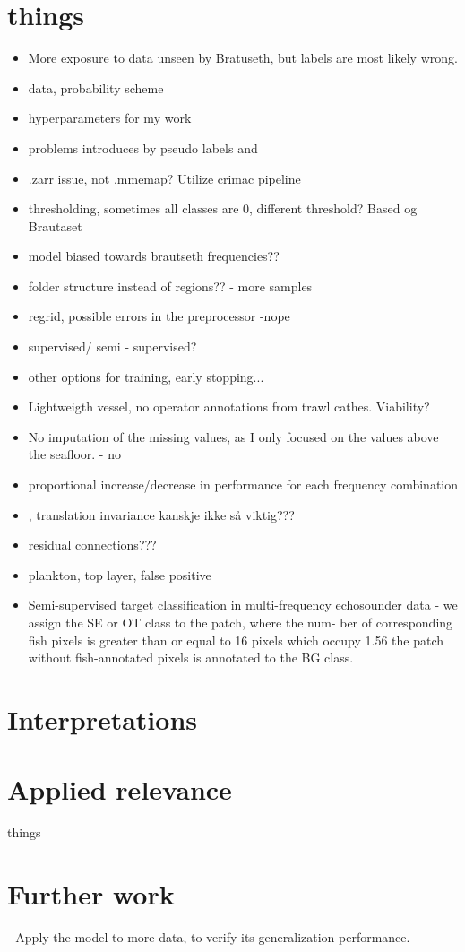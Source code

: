     \section{things}
        \begin{itemize}
            \item More exposure to data unseen by Bratuseth, but labels are most likely wrong. 
            \item data, probability scheme
            \item hyperparameters for my work
            \item problems introduces by pseudo labels and 
            \item .zarr issue, not .mmemap? Utilize crimac pipeline
            \item thresholding, sometimes all classes are 0, different threshold? Based og Brautaset
            \item model biased towards brautseth frequencies??
            \item folder structure instead of regions?? - more samples
            \item regrid, possible errors in the preprocessor -nope
            \item supervised/ semi - supervised? 
            \item other options for training, early stopping...
            \item Lightweigth vessel, no operator annotations from trawl cathes. Viability?
            \item No imputation of the missing values, as I only focused on the values above the seafloor. - no
            \item proportional increase/decrease in performance for each frequency combination \item \citet{mohammed2006acoustic}, translation invariance kanskje ikke så viktig???
            \item residual connections??? \cite{zhang2018road}
            \item plankton, top layer, false positive
            \item Semi-supervised target classification in multi-frequency
echosounder data - we assign the SE or OT class to the patch, where the num-
ber of corresponding fish pixels is greater than or equal to 16 pixels
which occupy 1.56%
the patch without fish-annotated pixels is annotated to the BG class.
        \end{itemize}

    \section{Interpretations}
    \section{Applied relevance}
        things
    
    
    \section{Further work}
        - Apply the model to more data, to verify its generalization performance.
        - 